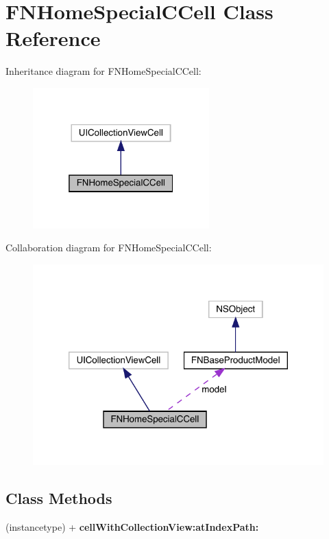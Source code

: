 \hypertarget{interface_f_n_home_special_c_cell}{}\section{F\+N\+Home\+Special\+C\+Cell Class Reference}
\label{interface_f_n_home_special_c_cell}


Inheritance diagram for F\+N\+Home\+Special\+C\+Cell\+:\nopagebreak
\begin{figure}[H]
\begin{center}
\leavevmode
\includegraphics[width=193pt]{interface_f_n_home_special_c_cell__inherit__graph}
\end{center}
\end{figure}


Collaboration diagram for F\+N\+Home\+Special\+C\+Cell\+:\nopagebreak
\begin{figure}[H]
\begin{center}
\leavevmode
\includegraphics[width=320pt]{interface_f_n_home_special_c_cell__coll__graph}
\end{center}
\end{figure}
\subsection*{Class Methods}
\begin{DoxyCompactItemize}
\item 
\mbox{\label{interface_f_n_home_special_c_cell_ac43f007109a954e0b56cbb3d8a62dc69}} 
(instancetype) + {\bfseries cell\+With\+Collection\+View\+:at\+Index\+Path\+:}
\end{DoxyCompactItemize}
